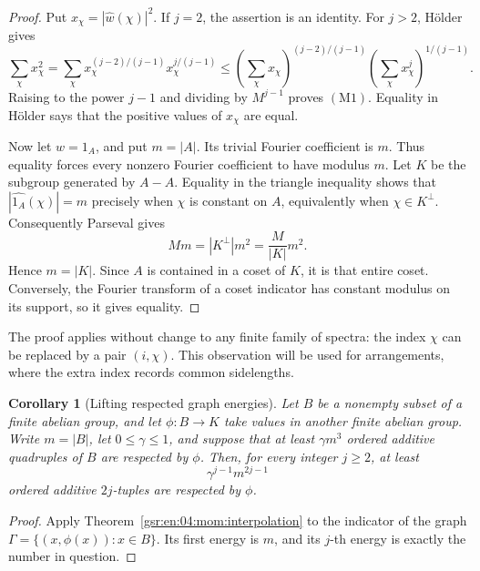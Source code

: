 \documentclass[11pt,letterpaper]{article}
\numberwithin{equation}{section}
\newtheorem{corollary}[theorem]{Corollary}
\theoremstyle{definition}
\theoremstyle{remark}
\newcommand{\1}{\mathbf 1}
\newcommand{\abs}[1]{\left|#1\right|}
\begin{document}
\begin{proof}
Put \(x_\chi=\abs{\widehat w(\chi)}^2\).  If \(j=2\), the assertion
is an identity.  For \(j>2\), H\"older gives
\[
 \sum_\chi x_\chi^2
 =
 \sum_\chi x_\chi^{(j-2)/(j-1)}
                 x_\chi^{j/(j-1)}
 \leq
 \left(\sum_\chi x_\chi\right)^{(j-2)/(j-1)}
 \left(\sum_\chi x_\chi^j\right)^{1/(j-1)}.
\]
Raising to the power \(j-1\) and dividing by \(M^{j-1}\) proves
\(\mathrm{(M1)}\).  Equality in H\"older says that the positive
values of \(x_\chi\) are equal.

Now let \(w=1_A\), and put \(m=\abs A\).  Its trivial Fourier
coefficient is \(m\).  Thus equality forces every nonzero Fourier
coefficient to have modulus \(m\).  Let \(K\) be the subgroup
generated by \(A-A\).  Equality in the triangle inequality shows
that \(\abs{\widehat{1_A}(\chi)}=m\) precisely when \(\chi\) is
constant on \(A\), equivalently when \(\chi\in K^\perp\).
Consequently Parseval gives
\[
 Mm=\abs{K^\perp}m^2=\frac{M}{\abs K}m^2.
\]
Hence \(m=\abs K\).  Since \(A\) is contained in a coset of \(K\),
it is that entire coset.  Conversely, the Fourier transform of a
coset indicator has constant modulus on its support, so it gives
equality.
\end{proof}

The proof applies without change to any finite family of spectra:
the index \(\chi\) can be replaced by a pair \((i,\chi)\).
This observation will be used for arrangements, where the extra
index records common sidelengths.

\begin{corollary}[Lifting respected graph energies]
\label{gsr:en:04:mom:graph}
Let \(B\) be a nonempty subset of a finite abelian group, and let
\(\phi:B\to K\) take values in another finite abelian group.
Write \(m=\abs B\), let \(0\leq\gamma\leq1\), and suppose that at least \(\gamma m^3\)
ordered additive quadruples of \(B\) are respected by \(\phi\).
Then, for every integer \(j\geq2\), at least
\[
 \gamma^{j-1}m^{2j-1}
 \tag{M3}
\]
ordered additive \(2j\)-tuples are respected by \(\phi\).
\end{corollary}

\begin{proof}
Apply Theorem~\ref{gsr:en:04:mom:interpolation} to the indicator of the graph
\(\Gamma=\{(x,\phi(x)):x\in B\}\).  Its first energy is \(m\),
and its \(j\)-th energy is exactly the number in question.
\end{proof}
\end{document}
